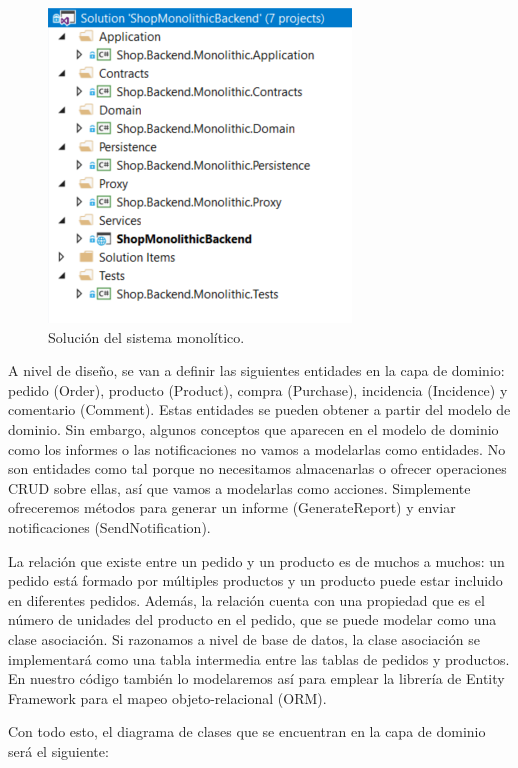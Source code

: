 \documentclass[11pt,spanish,listoffigures]{tfgetsinf}
\begin{document}
\begin{figure}[h]
\centering
\includegraphics[scale=0.8]{MonolithicSolution}
\caption{Solución del sistema monolítico.}
\end{figure}

A nivel de diseño, se van a definir las siguientes entidades en la capa de dominio: pedido (Order), producto (Product), compra (Purchase), incidencia (Incidence) y comentario (Comment). Estas entidades se pueden obtener a partir del modelo de dominio. Sin embargo, algunos conceptos que aparecen en el modelo de dominio como los informes o las notificaciones no vamos a modelarlas como entidades. No son entidades como tal porque no necesitamos almacenarlas o ofrecer operaciones CRUD sobre ellas, así que vamos a modelarlas como acciones. Simplemente ofreceremos métodos para generar un informe (GenerateReport) y enviar notificaciones (SendNotification).

La relación que existe entre un pedido y un producto es de muchos a muchos: un pedido está formado por múltiples productos y un producto puede estar incluido en diferentes pedidos. Además, la relación cuenta con una propiedad que es el número de unidades del producto en el pedido, que se puede modelar como una clase asociación. Si razonamos a nivel de base de datos, la clase asociación se implementará como una tabla intermedia entre las tablas de pedidos y productos. En nuestro código también lo modelaremos así para emplear la librería de Entity Framework para el mapeo objeto-relacional (ORM).

Con todo esto, el diagrama de clases que se encuentran en la capa de dominio será el siguiente:
\end{document}
